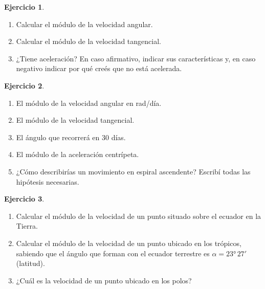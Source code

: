 \documentclass[a4paper,12pt,twoside]{book}
\newtheorem{ejercicio}{{Ejercicio}}[chapter]
\begin{document}
\begin{mdframed}[style=ejercicio-facil]
    \begin{ejercicio}
    \end{ejercicio}
    \begin{enumerate}
        \item Calcular el módulo de la velocidad angular.
        \item Calcular el módulo de la velocidad tangencial.
        \item ¿Tiene aceleración? En caso afirmativo, indicar sus características y, en caso negativo indicar por qué creés que no está acelerada.
    \end{enumerate}
\end{mdframed}

\begin{mdframed}[style=ejercicio-facil]
    \begin{ejercicio}
    \end{ejercicio}
    \begin{enumerate}
        \item El módulo de la velocidad angular en rad/día.
        \item El módulo de la velocidad tangencial.
        \item El ángulo que recorrerá en 30 días.
        \item El módulo de la aceleración centrípeta.
        \item ¿Cómo describirías un movimiento en espiral ascendente?
        Escribí todas las hipótesis necesarias.
    \end{enumerate}
\end{mdframed}

\begin{mdframed}[style=ejercicio-intermedio]
    \begin{ejercicio}
    \end{ejercicio}
    \begin{center}
        \def\svgwidth{0.4\linewidth}
        
    \end{center}
    \begin{enumerate}
        \item Calcular el módulo de la velocidad de un punto situado sobre el ecuador en la Tierra.
        \item Calcular el módulo de la velocidad de un punto ubicado en los trópicos, sabiendo que el ángulo que forman con el ecuador terrestre es $\alpha = \ang{23} \, 27'$ (latitud).
        \item ¿Cuál es la velocidad de un punto ubicado en los polos?
    \end{enumerate}
\end{mdframed}
\end{document}
